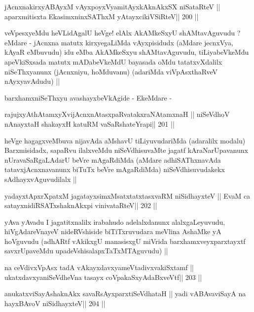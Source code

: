 \begin{shl}
jAcnxnakirxyABAyxM vAyxpoyxV\s yamitAyxkAknAkxSX niSataRteV ||
aparxmitisxta EkasimxninxSAThxM yAtayxcikiVSiRteV\hfill || 200 ||
\end{shl}

\begin{artha}
veVpesxyeMdu heVLidAgalU heVge! elAlx AkAMkeSxyU shAMtavAguvudu ?
eMdare - jAcnxna matutx kirxyegaLiMda vAyxpisidudx (aMdare jecnxVya,
kAyaR eMbuvudu) idu eMba AkAMkeSxyu shAMtavAguvudu, tiLiyabeVkeMdu
apeVkiSxsada matutx mADabeVkeMdU bayasada oMdu tatatxvXdalilx
niSeThxyanunx (jAcnxniyu, hoMduvanu) (adariMda viVpAsxthaRveV
nAyxyavAdudu) ||

barxhamxniSeThxyu avashayxbeVkAgide - EkeMdare -
\end{artha}

\begin{shl}
rajujxyAthAtamxyXvijAcnxnAtasxpaRvatakxraNAtamxnaH ||
niSeVdhoV nAnayxtaH shakayxH katuRM vaSaRshateYrapi\hfill || 201  ||
\end{shl}

\begin{artha}
heVge hagagxveMbuva nijavAda aMshavU tiLiyuvudariMda (adaralilx
modalu) Barxmisidadx, sapaRvu ilalxveMdu niSeVdhisuvaMte jagatf
kAraNarUpavanunx nUravaSaRgaLAdarU beVre mAgaRdiMda (aMdare
adhiSAThxnavAda tatavxjAcnxnavanunx biTuTx beVre mAgaRdiMda)
niSeVdhisuvudakekx sAdhayxvAguvudilalx ||
\end{artha}

\begin{shl}
yadayxtApxrXpatxM jagatayxsimxMsatxtatxtasxvaRM niSidhayxteV ||
EvaM ca satayxnidiRSATxshaknAkx\s pi vinivataRteV\hfill || 202 ||
\end{shl}

\begin{artha}
yAva yAvadu I jagatitxnalilx irabahudo adelalxdanunx alalxgaLeyuvudu,
hiVgAdareVnayeV nideRVshiside biTiTxruvudara meVlina AshaMke yA
hoVguvudu (adhARtf vAkikxgU manasisxgU miVrida barxhamxveyxparxtayxtf
savxrUpaveMdu upadeVshisalapxTaTxMTAguvudu) ||
\end{artha}

\begin{shl}
na ceVdivxVpAsx tadA vAkayxdavxyameVtadivxvakiSxtamf ||
ukatxdavxyaniSeVdheVna tasayx coVpakaSxyAdaBxveVtf\hfill || 203 ||
\end{shl}

\begin{shl}
anukatxviSayAshaknAkx savaRsAyxparxtiSeVdhataH ||
yadi vA\s BAvaviSayA na hayxBAvoV niSidhayxteV\hfill || 204 ||
\end{shl}

